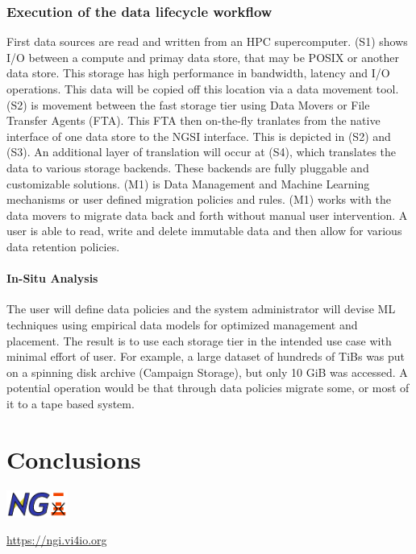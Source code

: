 \documentclass[a4paper, twocolumn]{article}
\begin{document}
\subsubsection{Execution of the data lifecycle workflow}
First data sources are read and written from an HPC supercomputer. (S1) shows I/O between a compute and primay data store, that may be POSIX or another data store. This storage has high performance in bandwidth, latency and I/O operations. This data will be copied off this location via a data movement tool. (S2) is movement between the fast storage tier using Data Movers or File Transfer Agents (FTA). This FTA then on-the-fly tranlates from the native interface of one data store to the NGSI interface. This is depicted in (S2) and (S3). An additional layer of translation will occur at (S4), which translates the data to various storage backends. These backends are fully pluggable and customizable solutions. (M1) is Data Management and Machine Learning mechanisms or user defined migration policies and rules. (M1) works with the data movers to migrate data back and forth without manual user intervention. A user is able to read, write and delete immutable data and then allow for various data retention policies.


\paragraph{In-Situ Analysis}
The user will define data policies and the system administrator will devise ML techniques using empirical data models for optimized management and placement. The result is to use each storage tier in the intended use case with minimal effort of user. For example, a large dataset of hundreds of TiBs was put on a spinning disk archive (Campaign Storage), but only 10 GiB was accessed. A potential operation would be that through data policies migrate some, or most of it to a tape based system.

\section{Conclusions}



\includegraphics[width=2cm]{ngi-logo}

\noindent\url{https://ngi.vi4io.org}
\end{document}
